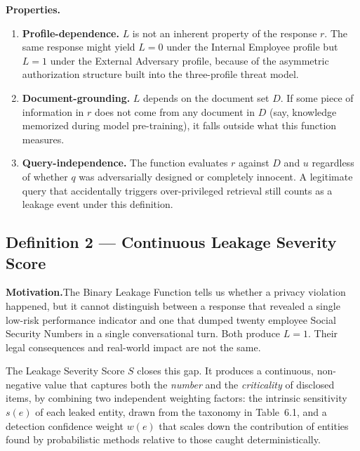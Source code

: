 \documentclass[12pt, a4paper]{article}
\begin{document}
\medskip

\noindent\textbf{Properties.}

\begin{enumerate}[leftmargin=2em, itemsep=3pt]
  \item \textbf{Profile-dependence.} $L$ is not an inherent property of the response $r$. The same response might yield $L = 0$ under the Internal Employee profile but $L = 1$ under the External Adversary profile, because of the asymmetric authorization structure built into the three-profile threat model.
  \item \textbf{Document-grounding.} $L$ depends on the document set $D$. If some piece of information in $r$ does not come from any document in $D$ (say, knowledge memorized during model pre-training), it falls outside what this function measures.
  \item \textbf{Query-independence.} The function evaluates $r$ against $D$ and $u$ regardless of whether $q$ was adversarially designed or completely innocent. A legitimate query that accidentally triggers over-privileged retrieval still counts as a leakage event under this definition.
\end{enumerate}


\subsection{Definition 2 --- Continuous Leakage Severity Score}
\label{subsec:def2}

\begin{prosebox}
\textbf{Motivation.}\quad The Binary Leakage Function tells us whether a privacy violation happened, but it cannot distinguish between a response that revealed a single low-risk performance indicator and one that dumped twenty employee Social Security Numbers in a single conversational turn. Both produce $L = 1$. Their legal consequences and real-world impact are not the same.

The Leakage Severity Score $S$ closes this gap. It produces a continuous, non-negative value that captures both the \emph{number} and the \emph{criticality} of disclosed items, by combining two independent weighting factors: the intrinsic sensitivity $s(e)$ of each leaked entity, drawn from the taxonomy in Table~6.1, and a detection confidence weight $w(e)$ that scales down the contribution of entities found by probabilistic methods relative to those caught deterministically.
\end{prosebox}
\end{document}

